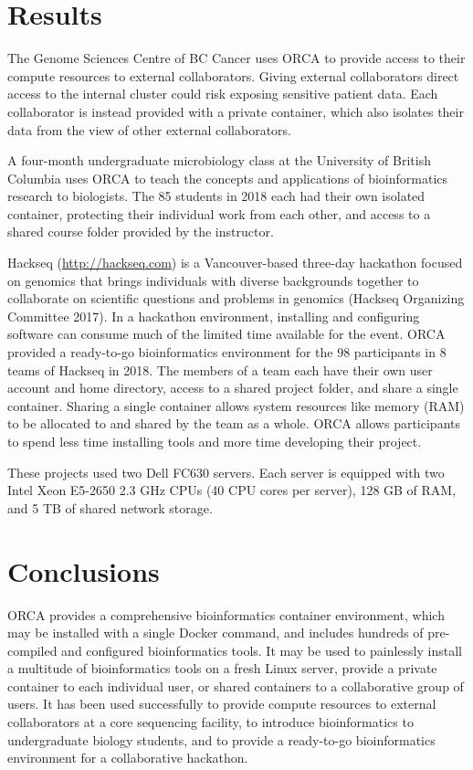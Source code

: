 \documentclass[
  12pt,
  oneside,
  openany]{book}
\begin{document}
\hypertarget{results-3}{%
\section{Results}\label{results-3}}

The Genome Sciences Centre of BC Cancer uses ORCA to provide access to their compute resources to external collaborators. Giving external collaborators direct access to the internal cluster could risk exposing sensitive patient data. Each collaborator is instead provided with a private container, which also isolates their data from the view of other external collaborators.

A four-month undergraduate microbiology class at the University of British Columbia uses ORCA to teach the concepts and applications of bioinformatics research to biologists. The 85 students in 2018 each had their own isolated container, protecting their individual work from each other, and access to a shared course folder provided by the instructor.

Hackseq (\url{http://hackseq.com}) is a Vancouver-based three-day hackathon focused on genomics that brings individuals with diverse backgrounds together to collaborate on scientific questions and problems in genomics (Hackseq Organizing Committee 2017). In a hackathon environment, installing and configuring software can consume much of the limited time available for the event. ORCA provided a ready-to-go bioinformatics environment for the 98 participants in 8 teams of Hackseq in 2018. The members of a team each have their own user account and home directory, access to a shared project folder, and share a single container. Sharing a single container allows system resources like memory (RAM) to be allocated to and shared by the team as a whole. ORCA allows participants to spend less time installing tools and more time developing their project.

These projects used two Dell FC630 servers. Each server is equipped with two Intel Xeon E5-2650 2.3 GHz CPUs (40 CPU cores per server), 128 GB of RAM, and 5 TB of shared network storage.

\hypertarget{conclusions-2}{%
\section{Conclusions}\label{conclusions-2}}

ORCA provides a comprehensive bioinformatics container environment, which may be installed with a single Docker command, and includes hundreds of pre-compiled and configured bioinformatics tools. It may be used to painlessly install a multitude of bioinformatics tools on a fresh Linux server, provide a private container to each individual user, or shared containers to a collaborative group of users. It has been used successfully to provide compute resources to external collaborators at a core sequencing facility, to introduce bioinformatics to undergraduate biology students, and to provide a ready-to-go bioinformatics environment for a collaborative hackathon.
\end{document}
